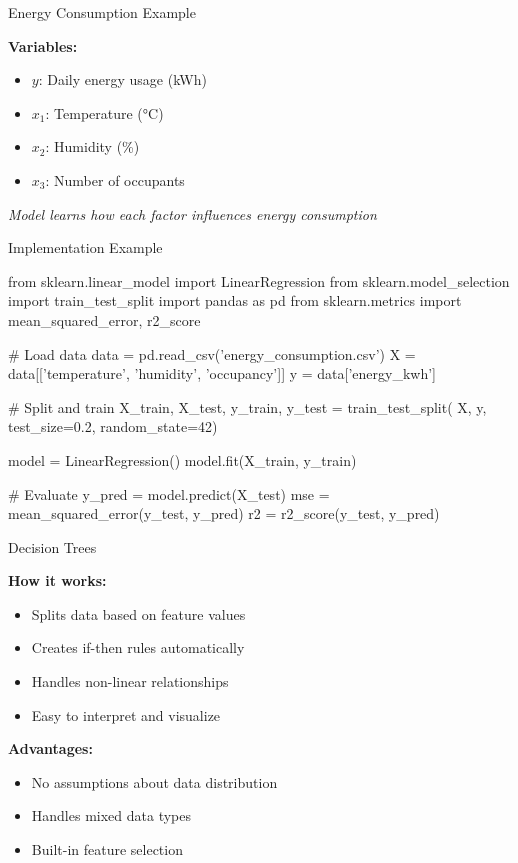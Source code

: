 \documentclass{sustainabilitylab}
\begin{document}
\begin{frame}{Energy Consumption Example}

\textbf{Variables:}
\begin{itemize}
  \item $y$: Daily energy usage (kWh)
  \item $x_1$: Temperature (°C)
  \item $x_2$: Humidity (\%)
  \item $x_3$: Number of occupants
\end{itemize}

\vspace{1cm}
\textit{Model learns how each factor influences energy consumption}

\end{frame}

\begin{frame}[fragile]{Implementation Example}

\begin{codebox}
from sklearn.linear_model import LinearRegression
from sklearn.model_selection import train_test_split
import pandas as pd
from sklearn.metrics import mean_squared_error, r2_score

# Load data
data = pd.read_csv('energy_consumption.csv')
X = data[['temperature', 'humidity', 'occupancy']]
y = data['energy_kwh']

# Split and train
X_train, X_test, y_train, y_test = train_test_split(
    X, y, test_size=0.2, random_state=42)

model = LinearRegression()
model.fit(X_train, y_train)

# Evaluate
y_pred = model.predict(X_test)
mse = mean_squared_error(y_test, y_pred)
r2 = r2_score(y_test, y_pred)
\end{codebox}
\end{frame}

\begin{frame}{Decision Trees}

\textbf{How it works:}
\begin{itemize}
  \item Splits data based on feature values
  \item Creates if-then rules automatically
  \item Handles non-linear relationships
  \item Easy to interpret and visualize
\end{itemize}

\textbf{Advantages:}
\begin{itemize}
  \item No assumptions about data distribution
  \item Handles mixed data types
  \item Built-in feature selection
\end{itemize}

\end{frame}
\end{document}
